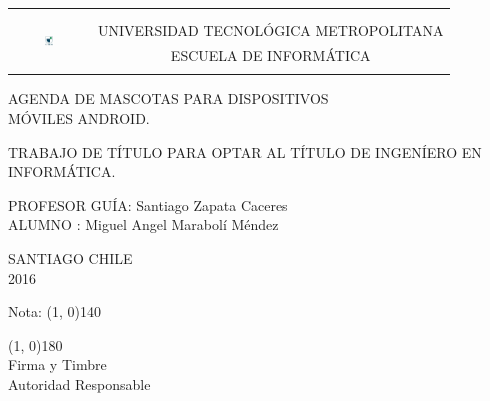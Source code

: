 \documentclass[letterpaper,12pt,openany,oneside]{book}
\begin{document}
\frontmatter

\thispagestyle{empty}
\begin{tabular*}{0.8\textwidth}{@{\extracolsep{\fill}} cc }
\multirow{6}{*}{\includegraphics[width=0.125\textwidth]{logo-utem.jpg}}
& \\
& \\
& UNIVERSIDAD TECNOL\'OGICA METROPOLITANA \\
& ESCUELA DE INFORM\'ATICA \\
& \\
\end{tabular*}

\begin{center}

\vspace{2cm}
AGENDA DE MASCOTAS PARA DISPOSITIVOS\\ MÓVILES ANDROID.\\
\vspace{2cm}
\end{center}

\begin{flushright}
\parbox[r]{9cm}{TRABAJO DE T\'ITULO PARA OPTAR AL T\'ITULO DE INGEN\'IERO EN INFORM\'ATICA.}
\end{flushright}
\vspace{2cm}
\begin{flushright}
PROFESOR GUÍA: Santiago Zapata Caceres\\
\vspace{1cm}
ALUMNO       : Miguel Angel Marabolí Méndez
\end{flushright}
\vspace{6cm}
\begin{center}
SANTIAGO CHILE  \\ 2016
\end{center}

\newpage

\begin{flushright}

\vspace*{20 mm}

Nota: \line(1, 0){140} \\

\vspace*{30 mm}

\line(1, 0){180}\\
Firma y Timbre\\
Autoridad Responsable
\end{flushright}
\end{document}
